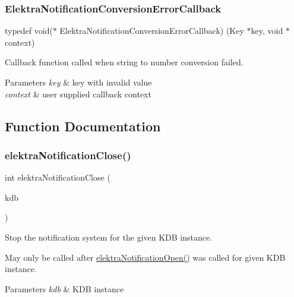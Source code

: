 \subsubsection{\texorpdfstring{ElektraNotificationConversionErrorCallback}{ElektraNotificationConversionErrorCallback}}
{\footnotesize\ttfamily typedef void($\ast$ Elektra\+Notification\+Conversion\+Error\+Callback) (Key $\ast$key, void $\ast$context)}



Callback function called when string to number conversion failed. 


\begin{DoxyParams}{Parameters}
{\em key} & key with invalid value \\
\hline
{\em context} & user supplied callback context \\
\hline
\end{DoxyParams}


\subsection{Function Documentation}
\mbox{\label{group__kdbnotification_ga5685dafbd4131011365628d6d9213594}} 
\subsubsection{\texorpdfstring{elektraNotificationClose()}{elektraNotificationClose()}}
{\footnotesize\ttfamily int elektra\+Notification\+Close (\begin{DoxyParamCaption}\item[{K\+DB $\ast$}]{kdb }\end{DoxyParamCaption})}



Stop the notification system for the given K\+DB instance. 

May only be called after \mbox{\hyperlink{group__kdbnotification_gaeae96154abdb5fdbf1b34a01e2b23e44}{elektra\+Notification\+Open()}} was called for given K\+DB instance.


\begin{DoxyParams}{Parameters}
{\em kdb} & K\+DB instance \\
\hline
\end{DoxyParams}

